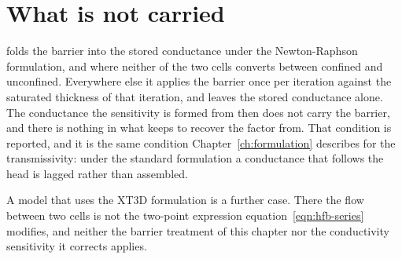 \section*{What is not carried}

\mf{} folds the barrier into the stored conductance under the Newton-Raphson formulation, and where neither of the two cells converts between confined and unconfined. Everywhere else it applies the barrier once per iteration against the saturated thickness of that iteration, and leaves the stored conductance alone. The conductance the sensitivity is formed from then does not carry the barrier, and there is nothing in what \mf{} keeps to recover the factor from. That condition is reported, and it is the same condition Chapter~\ref{ch:formulation} describes for the transmissivity: under the standard formulation a conductance that follows the head is lagged rather than assembled.

A model that uses the XT3D formulation is a further case. There the flow between two cells is not the two-point expression equation~\ref{eqn:hfb-series} modifies, and neither the barrier treatment of this chapter nor the conductivity sensitivity it corrects applies.
